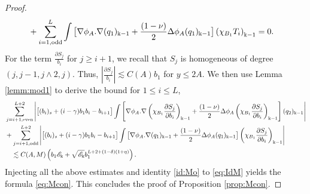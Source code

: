 \documentclass[11pt]{aims}
\theoremstyle{definition}
\numberwithin{equation}{section}
\begin{document}
\begin{proof}
\begin{align*}
& + \sum_{i = 1, \textup{odd}}^L\int \big[\nabla \phi_A . \nabla (q_1)_{\Bbbk - 1} + \frac{(1 - \nu)}{2}\Delta \phi_A (q_1)_{\Bbbk- 1} \big]\left(\chi_{B_1}T_i\right)_{\Bbbk - 1}=  0.
\end{align*}
For the term $\frac{\partial S_j}{b_i}$ for $j \geq i + 1$, we recall that $S_j$ is homogeneous of degree $(j, j - 1, j \wedge 2, j)$. Thus, $\left|\frac{\partial S_j}{b_i}\right| \lesssim C(A)b_1$ for $y \leq 2A$. We then use Lemma \ref{lemm:mod1} to derive the bound for $1 \leq i \leq L$,
 \begin{align*}
& \sum_{j = i+1, \textup{even}}^{L+2}\left| \big[(b_i)_s + (i - \gamma)b_1b_i - b_{i + 1}\big]\int \left[\nabla \phi_A . \nabla \left(\chi_{B_1}\frac{\partial S_j}{\partial b_i}\right)_{\Bbbk - 1} + \frac{(1 - \nu)}{2}\Delta \phi_A \left(\chi_{B_1}\frac{\partial S_j}{\partial b_i}\right)_{\Bbbk - 1} \right](q_2)_{\Bbbk - 1} \right| \\
& + \sum_{j = i+1, \textup{odd}}^{L+2}\left| \big[(b_i)_s + (i - \gamma)b_1b_i - b_{i + 1}\big]\int \big[\nabla \phi_A . \nabla (q_1)_{\Bbbk - 1} + \frac{(1 - \nu)}{2}\Delta \phi_A (q_1)_{\Bbbk- 1} \big]\left(\chi_{B_1}\frac{\partial S_j}{\partial b_i}\right)_{\Bbbk - 1} \right|\\
& \quad \lesssim C(A,M)\left(b_1{\mathscr{E}}_\Bbbk + \sqrt{{\mathscr{E}}_\Bbbk}b_1^{L + 2 + (1 - \delta)(1 + \eta)}\right).
\end{align*}
Injecting all the above estimates and identity \eqref{id:Mo} to \eqref{eq:IdM} yields the formula \eqref{eq:Mcon}. This concludes the proof of Proposition \ref{prop:Mcon}.
\end{proof}
\end{document}
